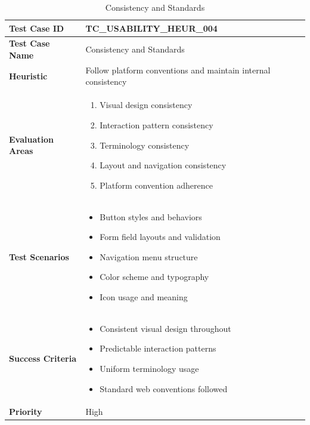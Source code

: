 \documentclass[12pt,a4paper]{article}
\begin{document}
\begin{longtable}{|p{3cm}|p{12cm}|}
\caption{Consistency and Standards} \\
\hline
\rowcolor{lightgray}
\textbf{Test Case ID} & \textbf{TC\_USABILITY\_HEUR\_004} \\
\hline
\textbf{Test Case Name} & Consistency and Standards \\
\hline
\textbf{Heuristic} & Follow platform conventions and maintain internal consistency \\
\hline
\textbf{Evaluation Areas} & 
\begin{enumerate}[nosep]
    \item Visual design consistency
    \item Interaction pattern consistency
    \item Terminology consistency
    \item Layout and navigation consistency
    \item Platform convention adherence
\end{enumerate} \\
\hline
\textbf{Test Scenarios} & 
\begin{itemize}[nosep]
    \item Button styles and behaviors
    \item Form field layouts and validation
    \item Navigation menu structure
    \item Color scheme and typography
    \item Icon usage and meaning
\end{itemize} \\
\hline
\textbf{Success Criteria} & 
\begin{itemize}[nosep]
    \item Consistent visual design throughout
    \item Predictable interaction patterns
    \item Uniform terminology usage
    \item Standard web conventions followed
\end{itemize} \\
\hline
\textbf{Priority} & High \\
\hline
\end{longtable}
\end{document}
